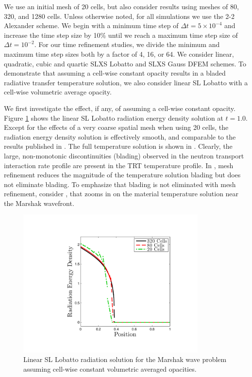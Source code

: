 We use an initial mesh of 20 cells, but also consider results using meshes of 80, 320, and 1280 cells.
Unless otherwise noted, for all simulations we use the 2-2 Alexander scheme.
We begin with a minimum time step of $\Delta t = 5\times 10^{-4}$ and increase the time step size by 10\% until we reach a maximum time step size of $\Delta t = 10^{-2}$.
For our time refinement studies, we divide the minimum and maximum time step sizes both by a factor of 4, 16, or 64.
We consider linear, quadratic, cubic and quartic SLXS Lobatto and SLXS Gauss DFEM schemes.
To demonstrate that assuming a cell-wise constant opacity results in a bladed radiative transfer temperature solution, we also consider linear SL Lobatto with a cell-wise volumetric average opacity.

We first investigate the effect, if any, of assuming a cell-wise constant opacity.  Figure \ref{fig:bladed_rad_profile} shows the linear SL Lobatto radiation energy density solution at $t=1.0$.
Except for the effects of a very coarse spatial mesh when using 20 cells, the radiation energy density solution is effectively smooth, and comparable to the results published in \cite{ober_shadid}.  
The full temperature solution is shown in .
Clearly, the large, non-monotonic discontinuities (blading) observed in the neutron transport interaction rate profile are present in the TRT temperature profile.
In , mesh refinement reduces the magnitude of the temperature solution blading but does not eliminate blading.
To emphasize that blading is not eliminated with mesh refinement, consider , that zooms in on the material temperature solution near the Marshak wavefront.
\begin{figure}[!htp]
\centering
\includegraphics[width=9.5cm,trim=1.2in  0.2in 0.75in 0.5in,clip=true]{chapter6_grey_radtran/Dissertation_Data/Reorder_Blading_Radiation_Full_MultiCell.pdf}
\caption{Linear SL Lobatto radiation solution for the Marshak wave problem assuming cell-wise constant volumetric averaged opacities.}
\label{fig:bladed_rad_profile}
\end{figure}
